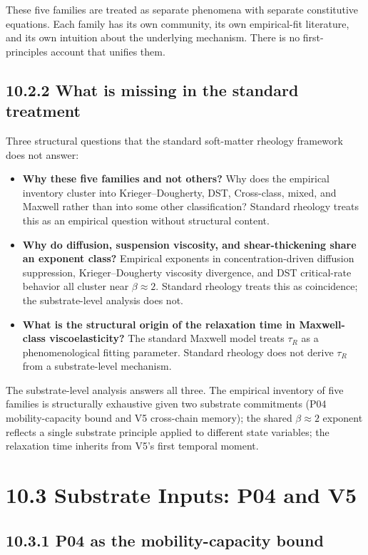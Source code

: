 \documentclass[11pt]{book}
\begin{document}
These five families are treated as separate phenomena with separate constitutive equations. Each family has its own community, its own empirical-fit literature, and its own intuition about the underlying mechanism. There is no first-principles account that unifies them.

\subsection{10.2.2 What is missing in the standard treatment}

Three structural questions that the standard soft-matter rheology framework does not answer:

\begin{itemize}
\item \textbf{Why these five families and not others?} Why does the empirical inventory cluster into Krieger–Dougherty, DST, Cross-class, mixed, and Maxwell rather than into some other classification? Standard rheology treats this as an empirical question without structural content.
\item \textbf{Why do diffusion, suspension viscosity, and shear-thickening share an exponent class?} Empirical exponents in concentration-driven diffusion suppression, Krieger–Dougherty viscosity divergence, and DST critical-rate behavior all cluster near $\beta \approx 2$. Standard rheology treats this as coincidence; the substrate-level analysis does not.
\item \textbf{What is the structural origin of the relaxation time in Maxwell-class viscoelasticity?} The standard Maxwell model treats $\tau_R$ as a phenomenological fitting parameter. Standard rheology does not derive $\tau_R$ from a substrate-level mechanism.
\end{itemize}

The substrate-level analysis answers all three. The empirical inventory of five families is structurally exhaustive given two substrate commitments (P04 mobility-capacity bound and V5 cross-chain memory); the shared $\beta \approx 2$ exponent reflects a single substrate principle applied to different state variables; the relaxation time inherits from V5's first temporal moment.

\section{10.3 Substrate Inputs: P04 and V5}

\subsection{10.3.1 P04 as the mobility-capacity bound}
\end{document}
